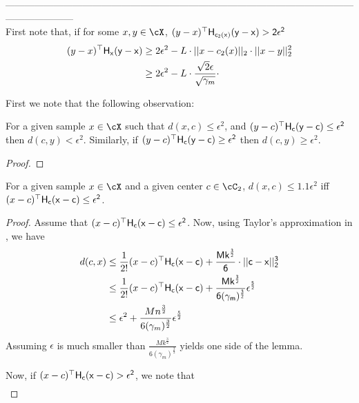  ---------------------------------------------------------------------------------------------------------------------------------\\

    First note that, if for some $x, y \in \cX$, $(y - x)^{\top}\sf{H}_{c_2(x)}(y - x) > 2\epsilon^2$
    \begin{align*}
        (y - x)^{\top}\sf{H}_{x}(y - x) &\ge 2\epsilon^2 - L\cdot ||x - c_2(x)||_2\cdot ||x - y||_2^2\\
                                        &\ge 2\epsilon^2 - L \cdot \frac{\sqrt{2}\epsilon}{\sqrt{\gamma_m}} \cdot 
    \end{align*}



    First we note that the following observation:
    \begin{lemma}
        For a given sample $x \in \cX$ such that $d(x,c) \le \epsilon^2$, and $(y- c)^{\top}\sf{H}_c(y-c) \le \epsilon^2$ then $d(c,y) < \epsilon^2$. Similarly, if $(y- c)^{\top}\sf{H}_c(y-c) \ge \epsilon^2$ then $d(c,y) \ge \epsilon^2$.
    \end{lemma}
    \begin{proof}
        
    \end{proof}
    \begin{lemma}
        For a given sample $x \in \cX$ and a given center $c \in \cC_2$, $d(x,c) \le 1.1\epsilon^2$ iff $(x- c)^{\top}\sf{H}_c(x-c) \le \epsilon^2$.
    \end{lemma}
    \begin{proof}
        Assume that $(x- c)^{\top}\sf{H}_c(x-c) \le \epsilon^2$. Now, using Taylor's approximation in , we have 
        \begin{align*}
            d(c,x) &\le \frac{1}{2!}(x-c)^{\top} \sf{H}_c (x-c) + \frac{M k^{\frac{3}{2}}}{6} \cdot||c-x||^{3}_2 \\
            &\le \frac{1}{2!}(x-c)^{\top} \sf{H}_c (x-c) + \frac{M k^{\frac{3}{2}}}{6(\gamma_m)^{\frac{3}{2}}}\epsilon^{\frac{5}{2}}\\
            &\le \epsilon^2 + \frac{M n^{\frac{3}{2}}}{6(\gamma_m)^{\frac{3}{2}}}\epsilon^{\frac{5}{2}}
        \end{align*}
        Assuming $\epsilon$ is much smaller than $\frac{M k^{\frac{3}{2}}}{6(\gamma_m)^{\frac{3}{2}}}$ yields one side of the lemma.

        Now, if $(x- c)^{\top}\sf{H}_c(x-c) > \epsilon^2$, we note that
        \begin{align*}
        \end{align*}
        
    \end{proof}


